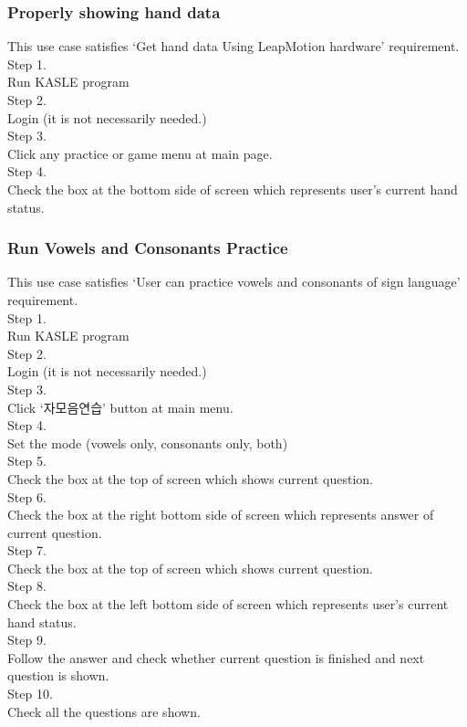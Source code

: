 \documentclass[10pt,journal,compsoc]{IEEEtran}
\begin{document}
\subsubsection{Properly showing hand data\\} 
This use case satisfies ‘Get hand data Using LeapMotion hardware’ requirement.
\\Step 1.
\\Run KASLE program
\\Step 2.
\\Login (it is not necessarily needed.)
\\Step 3.
\\Click any practice or game menu at main page.
\\Step 4. 
\\Check the box at the bottom side of screen which represents user’s current hand status.



\subsubsection{Run Vowels and Consonants Practice\\}
This use case satisfies ‘User can practice vowels and consonants of sign language’ requirement.
\\Step 1.
\\Run KASLE program
\\Step 2.
\\Login (it is not necessarily needed.)
\\Step 3.
\\Click ‘자모음연습’ button at main menu.
\\Step 4. 
\\Set the mode (vowels only, consonants only, both)
\\Step 5.
\\Check the box at the top of screen which shows current question.
\\Step 6.
\\Check the box at the right bottom side of screen which represents answer of current question.
\\Step 7.
\\Check the box at the top of screen which shows current question.
\\Step 8.
\\Check the box at the left bottom side of screen which represents user’s current hand status.
\\Step 9. 
\\Follow the answer and check whether current question is finished and next question is shown.
\\Step 10.
\\Check all the questions are shown.
\end{document}
